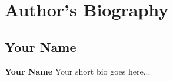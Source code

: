 
\blankpage

\chapter*{Author's Biography}


\section*{Your Name}

\textbf{Your Name}
Your short bio goes here...

